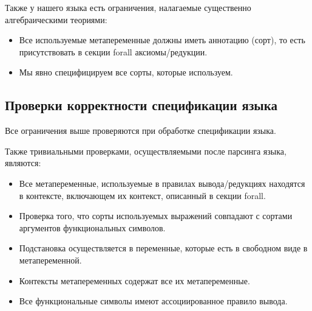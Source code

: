 Также у нашего языка есть ограничения, налагаемые существенно алгебраическими теориями:
\begin{itemize}
\item Все используемые метапеременные должны иметь аннотацию (сорт), то есть присутствовать в секции forall аксиомы/редукции.
\item Мы явно специфицируем все сорты, которые используем.
\end{itemize}

\subsection{Проверки корректности спецификации языка}

Все ограничения выше проверяются при обработке спецификации языка.

Также тривиальными проверками, осуществляемыми после парсинга языка, являются:
\begin{itemize}
\item Все метапеременные, используемые в правилах вывода/редукциях находятся в контексте, включающем их контекст, описанный в секции forall.
\item Проверка того, что сорты используемых выражений совпадают с сортами аргументов функциональных символов.
\item Подстановка осуществляется в переменные, которые есть в свободном виде в метапеременной.
\item Контексты метапеременных содержат все их метапеременные.
\item Все функциональные символы имеют ассоциированное правило вывода.
\end{itemize}
